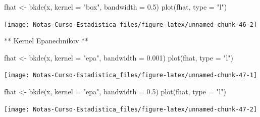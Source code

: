 \documentclass[
  12pt,
]{book}
\newenvironment{Shaded}{\begin{snugshade}}{\end{snugshade}}
\newcommand{\AttributeTok}[1]{\textcolor[rgb]{0.77,0.63,0.00}{#1}}
\newcommand{\FloatTok}[1]{\textcolor[rgb]{0.00,0.00,0.81}{#1}}
\newcommand{\FunctionTok}[1]{\textcolor[rgb]{0.00,0.00,0.00}{#1}}
\newcommand{\NormalTok}[1]{#1}
\newcommand{\OtherTok}[1]{\textcolor[rgb]{0.56,0.35,0.01}{#1}}
\newcommand{\StringTok}[1]{\textcolor[rgb]{0.31,0.60,0.02}{#1}}
\begin{document}
\begin{Shaded}
\begin{Highlighting}[]
\NormalTok{fhat }\OtherTok{\textless{}{-}} \FunctionTok{bkde}\NormalTok{(x, }\AttributeTok{kernel =} \StringTok{"box"}\NormalTok{, }\AttributeTok{bandwidth =} \FloatTok{0.5}\NormalTok{)}
\FunctionTok{plot}\NormalTok{(fhat, }\AttributeTok{type =} \StringTok{"l"}\NormalTok{)}
\end{Highlighting}
\end{Shaded}

\begin{center}\texttt{[image: Notas-Curso-Estadistica\_files/figure-latex/unnamed-chunk-46-2]} \end{center}

** Kernel Epanechnikov **

\begin{Shaded}
\begin{Highlighting}[]
\NormalTok{fhat }\OtherTok{\textless{}{-}} \FunctionTok{bkde}\NormalTok{(x, }\AttributeTok{kernel =} \StringTok{"epa"}\NormalTok{, }\AttributeTok{bandwidth =} \FloatTok{0.001}\NormalTok{)}
\FunctionTok{plot}\NormalTok{(fhat, }\AttributeTok{type =} \StringTok{"l"}\NormalTok{)}
\end{Highlighting}
\end{Shaded}

\begin{center}\texttt{[image: Notas-Curso-Estadistica\_files/figure-latex/unnamed-chunk-47-1]} \end{center}

\begin{Shaded}
\begin{Highlighting}[]
\NormalTok{fhat }\OtherTok{\textless{}{-}} \FunctionTok{bkde}\NormalTok{(x, }\AttributeTok{kernel =} \StringTok{"epa"}\NormalTok{, }\AttributeTok{bandwidth =} \FloatTok{0.5}\NormalTok{)}
\FunctionTok{plot}\NormalTok{(fhat, }\AttributeTok{type =} \StringTok{"l"}\NormalTok{)}
\end{Highlighting}
\end{Shaded}

\begin{center}\texttt{[image: Notas-Curso-Estadistica\_files/figure-latex/unnamed-chunk-47-2]} \end{center}
\end{document}
